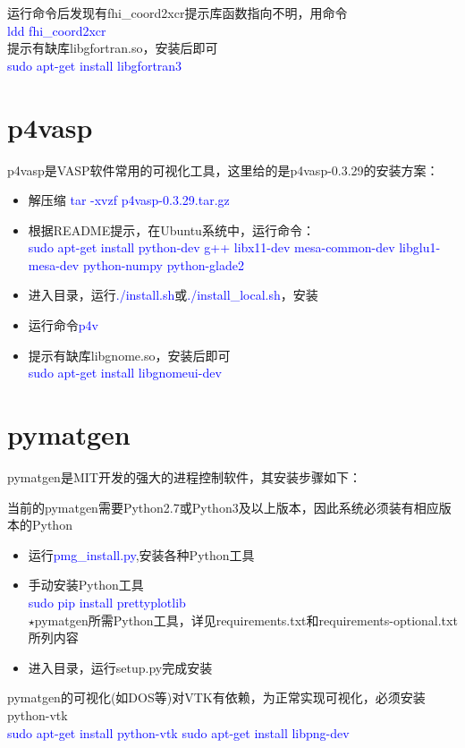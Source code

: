 \documentclass{article}      %
\begin{document}
运行命令后发现有\textrm{fhi\_coord2xcr}提示库函数指向不明，用命令\\
\textcolor{blue}{ldd\; fhi\_coord2xcr}\\
提示有缺库\textrm{libgfortran.so}，安装后即可\\
\textcolor{blue}{sudo\; apt-get\; install\; libgfortran3}

\section{p4vasp}
\textrm{p4vasp}是\textrm{VASP}软件常用的可视化工具，这里给的是\textrm{p4vasp-0.3.29}的安装方案：
\begin{itemize}
	\item 解压缩 \textcolor{blue}{tar\; -xvzf\; p4vasp-0.3.29.tar.gz}
	\item 根据\textrm{README}提示，在\textrm{Ubuntu}系统中，运行命令：\\
		\textcolor{blue}{sudo\; apt-get\; install\; python-dev\; g++\; libx11-dev\; mesa-common-dev\; libglu1-mesa-dev\; python-numpy\; python-glade2}
	\item 进入目录，运行\textcolor{blue}{./install.sh}或\textcolor{blue}{./install\_local.sh}，安装
	\item 运行命令\textcolor{blue}{p4v}
	\item 提示有缺库\textrm{libgnome.so}，安装后即可\\
\textcolor{blue}{sudo\; apt-get\; install\; libgnomeui-dev}
\end{itemize}

\section{pymatgen}
\textrm{pymatgen}是\textrm{MIT}开发的强大的进程控制软件，其安装步骤如下：

当前的\textrm{pymatgen}需要\textrm{Python2.7}或\textrm{Python3}及以上版本，因此系统必须装有相应版本的\textrm{Python}

\begin{itemize}
	\item 运行\textcolor{blue}{pmg\_install.py},安装各种\textrm{Python}工具
	\item 手动安装\textrm{Python}工具\\
		\textcolor{blue}{sudo pip install prettyplotlib}\\
		$\star$\textrm{pymatgen}所需\textrm{Python}工具，详见\textrm{requirements.txt}和\textrm{requirements-optional.txt}所列内容
	\item 进入目录，运行\textrm{setup.py}完成安装
\end{itemize}
\textrm{pymatgen}的可视化(如\textrm{DOS}等)对\textrm{VTK}有依赖，为正常实现可视化，必须安装\textrm{python-vtk}\\
\textcolor{blue}{sudo\; apt-get\; install\; python-vtk}
\textcolor{blue}{sudo\; apt-get\; install\; libpng-dev}
\end{document}

